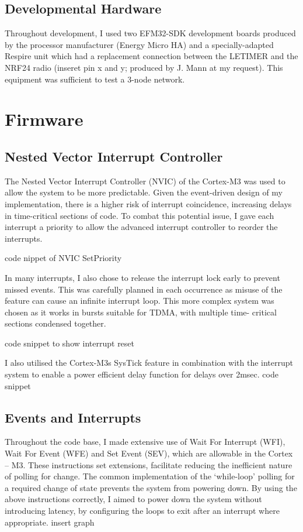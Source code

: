\subsection{Developmental Hardware}
Throughout development, I used two EFM32-SDK development boards produced by the processor
manufacturer (Energy Micro HA) and a specially-adapted Respire unit which had a replacement
connection between the LETIMER and the NRF24 radio (inseret pin x and y; produced by J. Mann at
my request). This equipment was sufficient to test a 3-node network.

\section{Firmware}

\subsection{Nested Vector Interrupt Controller}
The Nested Vector Interrupt Controller (NVIC) of the Cortex-M3 was used to allow the system to be
more predictable. Given the event-driven design of my implementation, there is a higher risk of
interrupt coincidence, increasing delays in time-critical sections of code. To combat this potential
issue, I gave each interrupt a priority to allow the advanced interrupt controller to reorder the
interrupts.

{code nippet of NVIC SetPriority}

In many interrupts, I also chose to release the interrupt lock early to prevent missed events. This was
carefully planned in each occurrence as misuse of the feature can cause an infinite interrupt loop.
This more complex system was chosen as it works in bursts suitable for TDMA, with multiple time-
critical sections condensed together.


{code snippet to show interrupt reset}


I also utilised the Cortex-M3s SysTick feature in combination with the interrupt system to enable a
power efficient delay function for delays over 2msec.
{code snippet}


\subsection{Events and Interrupts}
Throughout the code base, I made extensive use of Wait For Interrupt (WFI), Wait For Event (WFE)
and Set Event (SEV), which are allowable in the Cortex – M3. These instructions set extensions,
facilitate reducing the inefficient nature of polling for change. The common implementation of the
‘while-loop’ polling for a required change of state prevents the system from powering down. By
using the above instructions correctly, I aimed to power down the system without introducing
latency, by configuring the loops to exit after an interrupt where appropriate.
{insert graph}


